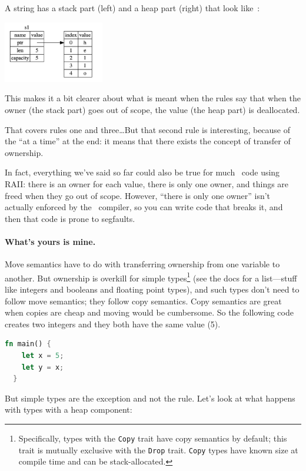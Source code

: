 A string has a stack part (left) and a heap part (right) that look like~\cite{rustdocs}:
\begin{center}
\includegraphics[width=0.33\textwidth]{images/string.png} 
\end{center}

This makes it a bit clearer about what is meant when the rules say that when the owner (the stack part) goes out of scope, the value (the heap part) is deallocated.

That covers rules one and three\ldots But that second rule is interesting, because of the ``at a time'' at the end: it means that there exists the concept of transfer of ownership.

In fact, everything we've said so far could also be true for much \CPP~code using RAII: there is an owner for each value, there is only one owner, and things are freed when they go out of scope. However, ``there is only one owner'' isn't actually enforced by the \CPP~compiler, so you can write code that breaks it, and then that code is prone to segfaults. 

\paragraph{What's yours is mine.}
Move semantics have to do with transferring ownership from one variable to another. But ownership is overkill for simple types\footnote{Specifically, types with the \texttt{Copy} trait have copy semantics by default; this trait is mutually exclusive with the \texttt{Drop} trait. \texttt{Copy} types have known size at compile time and can be stack-allocated.} (see the docs for a list---stuff like integers and booleans and floating point types), and such types don't need to follow move semantics; they follow copy semantics. Copy semantics are great when copies are cheap and moving would be cumbersome. So the following code creates two integers and they both have the same value (5).

\begin{lstlisting}[language=Rust]
  fn main() {
   	let x = 5;
	let y = x;
  }
\end{lstlisting}

But simple types are the exception and not the rule. Let's look at what happens with types with a heap component:

